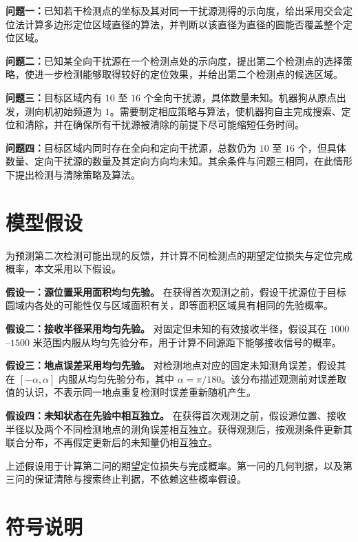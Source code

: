 \documentclass[UTF8,a4paper,zihao=-4,fontset=none]{ctexart}
\begin{document}
\textbf{问题一：}已知若干检测点的坐标及其对同一干扰源测得的示向度，给出采用交会定位法计算多边形定位区域直径的算法，并判断以该直径为直径的圆能否覆盖整个定位区域。

\textbf{问题二：}已知某全向干扰源在一个检测点处的示向度，提出第二个检测点的选择策略，使进一步检测能够取得较好的定位效果，并给出第二个检测点的候选区域。

\textbf{问题三：}目标区域内有 \(10\) 至 \(16\) 个全向干扰源，具体数量未知。机器狗从原点出发，测向机初始频道为 \(1\)。需要制定相应策略与算法，使机器狗自主完成搜索、定位和清除，并在确保所有干扰源被清除的前提下尽可能缩短任务时间。

\textbf{问题四：}目标区域内同时存在全向和定向干扰源，总数仍为 \(10\) 至 \(16\) 个，但具体数量、定向干扰源的数量及其定向方向均未知。其余条件与问题三相同，在此情形下提出检测与清除策略及算法。


\section{模型假设}

为预测第二次检测可能出现的反馈，并计算不同检测点的期望定位损失与定位完成概率，本文采用以下假设。

\textbf{假设一：源位置采用面积均匀先验。} 在获得首次观测之前，假设干扰源位于目标圆域内各处的可能性仅与区域面积有关，即等面积区域具有相同的先验概率。

\textbf{假设二：接收半径采用均匀先验。} 对固定但未知的有效接收半径，假设其在 \(1000\)--\(1500\) 米范围内服从均匀先验分布，用于计算不同源距下能够接收信号的概率。

\textbf{假设三：地点误差采用均匀先验。} 对检测地点对应的固定未知测角误差，假设其在 \([-\alpha,\alpha]\) 内服从均匀先验分布，其中 \(\alpha=\pi/180\)。该分布描述观测前对误差取值的认识，不表示同一地点重复检测时误差重新随机产生。

\textbf{假设四：未知状态在先验中相互独立。} 在获得首次观测之前，假设源位置、接收半径以及两个不同检测地点的测角误差相互独立。获得观测后，按观测条件更新其联合分布，不再假定更新后的未知量仍相互独立。

上述假设用于计算第二问的期望定位损失与完成概率。第一问的几何判据，以及第三问的保证清除与搜索终止判据，不依赖这些概率假设。

\section{符号说明}
\end{document}
